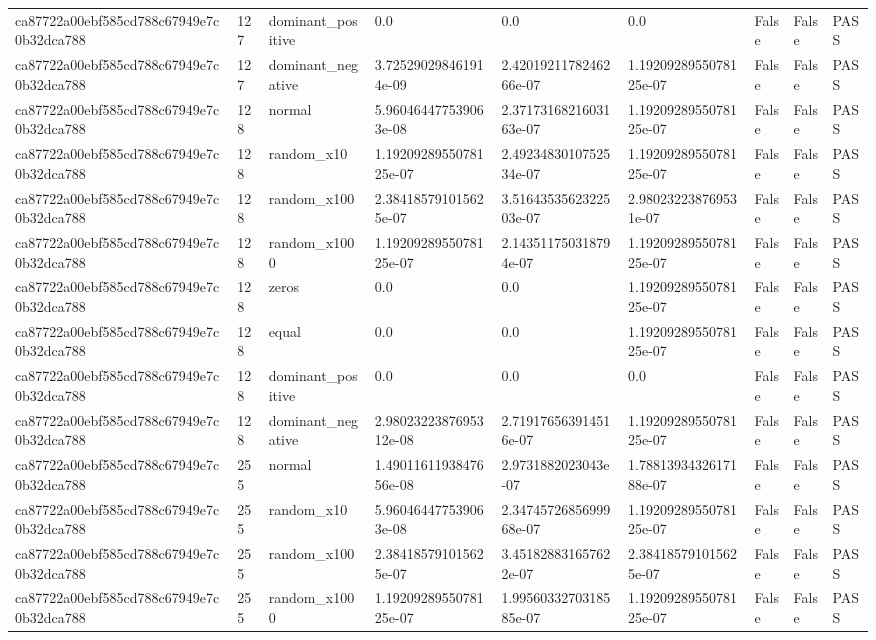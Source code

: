\begin{tabular}{lllllllll}
ca87722a00ebf585cd788c67949e7c0b32dca788 & 127 & dominant\_positive & 0.0 & 0.0 & 0.0 & False & False & PASS \\
ca87722a00ebf585cd788c67949e7c0b32dca788 & 127 & dominant\_negative & 3.725290298461914e-09 & 2.4201921178246266e-07 & 1.1920928955078125e-07 & False & False & PASS \\
ca87722a00ebf585cd788c67949e7c0b32dca788 & 128 & normal & 5.960464477539063e-08 & 2.3717316821603163e-07 & 1.1920928955078125e-07 & False & False & PASS \\
ca87722a00ebf585cd788c67949e7c0b32dca788 & 128 & random\_x10 & 1.1920928955078125e-07 & 2.4923483010752534e-07 & 1.1920928955078125e-07 & False & False & PASS \\
ca87722a00ebf585cd788c67949e7c0b32dca788 & 128 & random\_x100 & 2.384185791015625e-07 & 3.5164353562322503e-07 & 2.980232238769531e-07 & False & False & PASS \\
ca87722a00ebf585cd788c67949e7c0b32dca788 & 128 & random\_x1000 & 1.1920928955078125e-07 & 2.143511750318794e-07 & 1.1920928955078125e-07 & False & False & PASS \\
ca87722a00ebf585cd788c67949e7c0b32dca788 & 128 & zeros & 0.0 & 0.0 & 1.1920928955078125e-07 & False & False & PASS \\
ca87722a00ebf585cd788c67949e7c0b32dca788 & 128 & equal & 0.0 & 0.0 & 1.1920928955078125e-07 & False & False & PASS \\
ca87722a00ebf585cd788c67949e7c0b32dca788 & 128 & dominant\_positive & 0.0 & 0.0 & 0.0 & False & False & PASS \\
ca87722a00ebf585cd788c67949e7c0b32dca788 & 128 & dominant\_negative & 2.9802322387695312e-08 & 2.719176563914516e-07 & 1.1920928955078125e-07 & False & False & PASS \\
ca87722a00ebf585cd788c67949e7c0b32dca788 & 255 & normal & 1.4901161193847656e-08 & 2.9731882023043e-07 & 1.7881393432617188e-07 & False & False & PASS \\
ca87722a00ebf585cd788c67949e7c0b32dca788 & 255 & random\_x10 & 5.960464477539063e-08 & 2.3474572685699968e-07 & 1.1920928955078125e-07 & False & False & PASS \\
ca87722a00ebf585cd788c67949e7c0b32dca788 & 255 & random\_x100 & 2.384185791015625e-07 & 3.451828831657622e-07 & 2.384185791015625e-07 & False & False & PASS \\
ca87722a00ebf585cd788c67949e7c0b32dca788 & 255 & random\_x1000 & 1.1920928955078125e-07 & 1.9956033270318585e-07 & 1.1920928955078125e-07 & False & False & PASS \\

\end{tabular}
